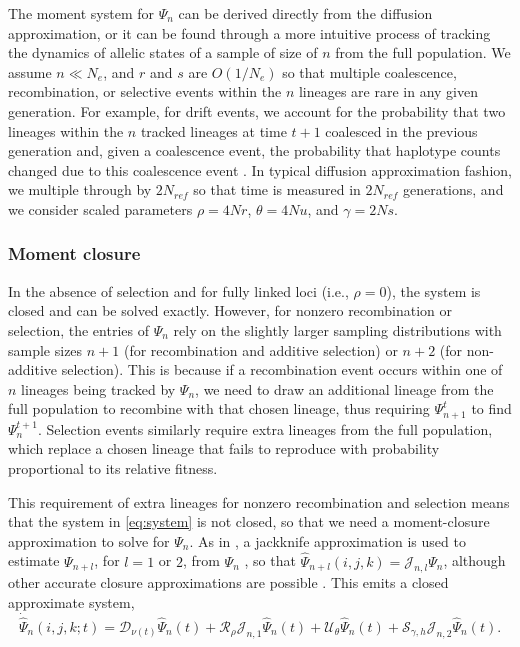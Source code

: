 \documentclass[]{article}
\begin{document}
The moment system for \(\Psi_n\) can be derived directly from the diffusion
approximation, or it can be found through a more intuitive process of tracking
the dynamics of allelic states of a sample of size of \(n\) from the full
population. We assume \(n \ll N_e\), and \(r\) and \(s\) are \(O(1/N_e)\) so
that multiple coalescence, recombination, or selective events within the \(n\)
lineages are rare in any given generation. For example, for drift events, we
account for the probability that two lineages within the \(n\) tracked lineages
at time \(t+1\) coalesced in the previous generation and, given a coalescence
event, the probability that haplotype counts changed due to this coalescence
event \citep[Supporting Information;][]{Jouganous2017-pq,Ragsdale2019-nt}. In
typical diffusion approximation fashion, we multiple through by \(2N_{ref}\) so
that time is measured in \(2N_{ref}\) generations, and we consider scaled
parameters \(\rho = 4Nr\), \(\theta = 4Nu\), and \(\gamma=2Ns\).

\subsubsection{Moment closure}\label{moment-closure}

In the absence of selection and for fully linked loci (i.e., \(\rho=0\)), the
system is closed and can be solved exactly. However, for nonzero recombination
or selection, the entries of \(\Psi_n\) rely on the slightly larger sampling
distributions with sample sizes \(n+1\) (for recombination and additive
selection) or \(n+2\) (for non-additive selection). This is because if a
recombination event occurs within one of \(n\) lineages being tracked by
\(\Psi_n\), we need to draw an additional lineage from the full population to
recombine with that chosen lineage, thus requiring \(\Psi_{n+1}^t\) to find
\(\Psi_n^{t+1}\). Selection events similarly require extra lineages from the full
population, which replace a chosen lineage that fails to reproduce with
probability proportional to its relative fitness.

This requirement of extra lineages for nonzero recombination and selection
means that the system in \eqref{eq:system} is not closed, so that we need a
moment-closure approximation to solve for \(\Psi_n\). As in \citet{Ragsdale2019-nt}, a
jackknife approximation is used to estimate \(\Psi_{n+l}\), for \(l=1\) or \(2\),
from \(\Psi_n\) \citep[following the single-locus closure introduced in][]{Jouganous2017-pq}, so that \(\hat{\Psi}_{n+l}(i, j, k) = \mathcal{J}_{n, l}\Psi_n\), although other accurate closure approximations are possible
\citep{Friedlander2022-bs}. This emits a closed approximate system,
\begin{equation}
\label{eq:closed-system}
\dot{\hat\Psi}_n(i, j, k; t) =
\mathcal{D}_{\nu(t)}\hat\Psi_n(t)
+ \mathcal{R}_{\rho}\mathcal{J}_{n, 1}\hat\Psi_{n}(t)
+ \mathcal{U}_{\theta}\hat\Psi_n(t)
+ \mathcal{S}_{\gamma, h}\mathcal{J}_{n, 2}\hat\Psi_{n}(t).
\end{equation}
\end{document}
